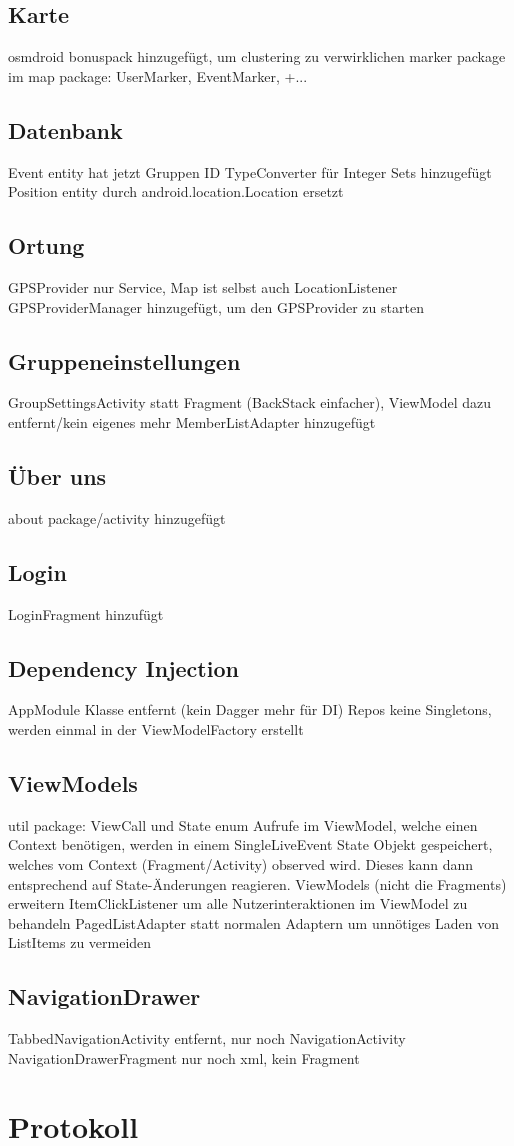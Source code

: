 \documentclass[parskip=full,11pt]{scrartcl}
\begin{document}
\subsection{Karte}
osmdroid bonuspack hinzugefügt, um clustering zu verwirklichen
marker package im map package: UserMarker, EventMarker, +...

\subsection{Datenbank}
Event entity hat jetzt Gruppen ID
TypeConverter für Integer Sets hinzugefügt
Position entity durch android.location.Location ersetzt

\subsection{Ortung}
GPSProvider nur Service, Map ist selbst auch LocationListener
GPSProviderManager hinzugefügt, um den GPSProvider zu starten

\subsection{Gruppeneinstellungen}
GroupSettingsActivity statt Fragment (BackStack einfacher), ViewModel dazu entfernt/kein eigenes mehr
MemberListAdapter hinzugefügt

\subsection{Über uns}
about package/activity hinzugefügt

\subsection{Login}
LoginFragment hinzufügt

\subsection{Dependency Injection}
AppModule Klasse entfernt (kein Dagger mehr für DI)
Repos keine Singletons, werden einmal in der ViewModelFactory erstellt

\subsection{ViewModels}
util package: ViewCall und State enum
Aufrufe im ViewModel, welche einen Context benötigen, werden in einem SingleLiveEvent State Objekt gespeichert, welches vom Context (Fragment/Activity) observed wird. Dieses kann dann entsprechend auf State-Änderungen reagieren.
ViewModels (nicht die Fragments) erweitern ItemClickListener um alle Nutzerinteraktionen im ViewModel zu behandeln
PagedListAdapter statt normalen Adaptern um unnötiges Laden von ListItems zu vermeiden

\subsection{NavigationDrawer}
TabbedNavigationActivity entfernt, nur noch NavigationActivity
NavigationDrawerFragment nur noch xml, kein Fragment


\pagebreak
\section{Protokoll}
\end{document}
